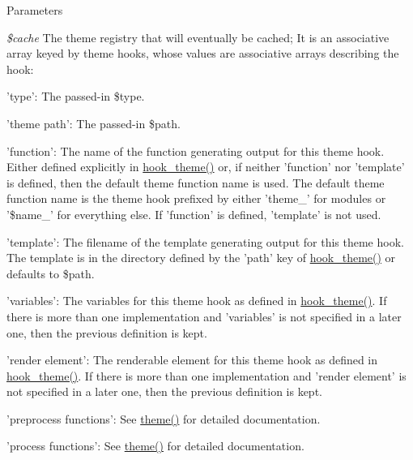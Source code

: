\begin{DoxyParams}{Parameters}
\item[{\em \$cache}]The theme registry that will eventually be cached; It is an associative array keyed by theme hooks, whose values are associative arrays describing the hook:
\begin{DoxyItemize}
\item 'type': The passed-\/in \$type.
\item 'theme path': The passed-\/in \$path.
\item 'function': The name of the function generating output for this theme hook. Either defined explicitly in \hyperlink{group__hooks_ga013ccb45c7aaab1c16cf9691428c910d}{hook\_\-theme()} or, if neither 'function' nor 'template' is defined, then the default theme function name is used. The default theme function name is the theme hook prefixed by either 'theme\_\-' for modules or '\$name\_\-' for everything else. If 'function' is defined, 'template' is not used.
\item 'template': The filename of the template generating output for this theme hook. The template is in the directory defined by the 'path' key of \hyperlink{group__hooks_ga013ccb45c7aaab1c16cf9691428c910d}{hook\_\-theme()} or defaults to \$path.
\item 'variables': The variables for this theme hook as defined in \hyperlink{group__hooks_ga013ccb45c7aaab1c16cf9691428c910d}{hook\_\-theme()}. If there is more than one implementation and 'variables' is not specified in a later one, then the previous definition is kept.
\item 'render element': The renderable element for this theme hook as defined in \hyperlink{group__hooks_ga013ccb45c7aaab1c16cf9691428c910d}{hook\_\-theme()}. If there is more than one implementation and 'render element' is not specified in a later one, then the previous definition is kept.
\item 'preprocess functions': See \hyperlink{includes_2theme_8inc_a7c25609a935874541a19657affd30fff}{theme()} for detailed documentation.
\item 'process functions': See \hyperlink{includes_2theme_8inc_a7c25609a935874541a19657affd30fff}{theme()} for detailed documentation. 

\end{DoxyItemize}
\end{DoxyParams}
